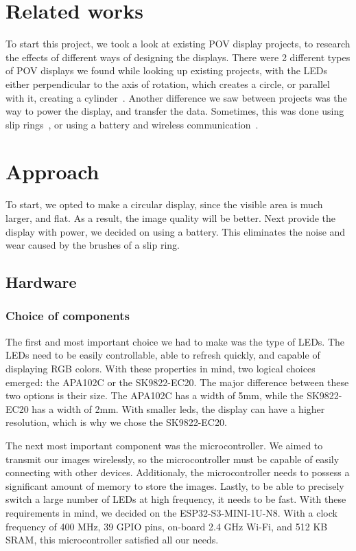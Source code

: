 \documentclass[10pt,twocolumn,letterpaper]{article}
\begin{document}
\section{Related works}

To start this project, we took a look at existing POV display projects, to research the effects of different ways of designing the displays.
There were 2 different types of POV displays we found while looking up existing projects, with the LEDs either perpendicular to the axis of rotation, which creates a circle, or parallel with it, creating a cylinder~\cite{Hackaday1}. 
Another difference we saw between projects was the way to power the display, and transfer the data. Sometimes, this was done using slip rings~\cite{instructablesVUB}, or using a battery and wireless communication~\cite{crawfish01}.

\section{Approach}
To start, we opted to make a circular display, since the visible area is much larger, and flat. As a result, the image quality will be better.
Next provide the display with power, we decided on using a battery. This eliminates the noise and wear caused by the brushes of a slip ring.
\subsection{Hardware}
\subsubsection{Choice of components}
The first and most important choice we had to make was the type of LEDs. The LEDs need to be easily controllable, able to refresh quickly, and capable of displaying RGB colors. With these properties in mind, two logical choices emerged: the APA102C or the SK9822-EC20.
The major difference between these two options is their size. The APA102C has a width of 5mm, while the SK9822-EC20 has a width of 2mm. With smaller leds, the display can have a higher resolution, which is why we chose the SK9822-EC20.

The next most important component was the microcontroller. We aimed to transmit our images wirelessly, so the microcontroller must be capable of easily connecting with other devices. Additionaly, the microcontroller needs to possess a significant amount of memory to store the images. Lastly, to be able to precisely switch a large number of LEDs at high frequency, it needs to be fast.
With these requirements in mind, we decided on the ESP32-S3-MINI-1U-N8. With a clock frequency of 400 MHz, 39 GPIO pins, on-board 2.4 GHz Wi-Fi, and 512 KB SRAM, this microcontroller satisfied all our needs.
\end{document}
